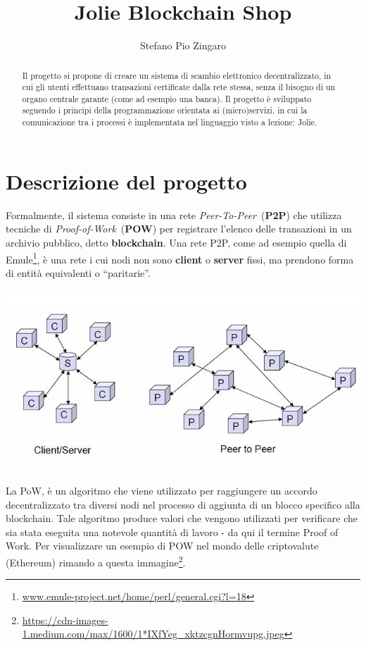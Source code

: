 \documentclass{article}
\title{Jolie Blockchain Shop}
\author{Stefano Pio Zingaro}
\begin{document}
\maketitle

\begin{abstract}
Il progetto si propone di creare un sistema di scambio elettronico decentralizzato, in cui gli utenti effettuano transazioni certificate dalla rete stessa, senza il bisogno di un organo centrale garante (come ad esempio una banca). Il progetto è sviluppato seguendo i principi della programmazione orientata ai (micro)servizi, in cui la comunicazione tra i processi è implementata nel linguaggio visto a lezione: Jolie.
\end{abstract}

\section{Descrizione del progetto}
%
Formalmente, il sistema consiste in una rete \textit{Peer-To-Peer}~(\textbf{P2P}) che utilizza tecniche di \textit{Proof-of-Work}~(\textbf{POW}) per registrare l'elenco delle transazioni in un archivio pubblico, detto \textbf{blockchain}. 
Una rete P2P, come ad esempio quella di Emule\footnote{\url{www.emule-project.net/home/perl/general.cgi?l=18}}, è una rete i cui nodi non sono \textbf{client} o \textbf{server} fissi, ma prendono forma di entità equivalenti o ``paritarie''.
%
\begin{center}
    \includegraphics[width=.7\linewidth]{img/p2p}
\end{center}
%
La PoW, è un algoritmo che viene utilizzato per raggiungere un accordo decentralizzato tra diversi nodi nel processo di aggiunta di un blocco specifico alla blockchain.
Tale algoritmo produce valori che vengono utilizzati per verificare che sia stata eseguita una notevole quantità di lavoro - da qui il termine Proof of Work. Per visualizzare un esempio di POW nel mondo delle criptovalute (Ethereum) rimando a questa immagine\footnote{\url{https://cdn-images-1.medium.com/max/1600/1*IXfYeg_xktzcgnHormvupg.jpeg}}.
%
\end{document}
